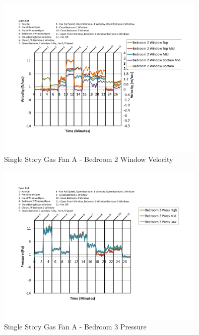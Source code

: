 \documentclass{article}
\begin{document}
\begin{appendices}
	\clearpage

	\begin{figure}[H]
		\centering
		\includegraphics[height=3.05in,trim=0.67in 1.1in 0.67in 0.8in,clip=true]{0_Images/Results_Charts/ColdFlow/Single_Story/Gas/A/Bedroom_2_Window_Velocity.pdf}
		\caption{Single Story Gas Fan A - Bedroom 2 Window Velocity}
	\end{figure}
 

	\begin{figure}[H]
		\centering
		\includegraphics[height=3.05in,trim=0.67in 1.1in 0.67in 0.8in,clip=true]{0_Images/Results_Charts/ColdFlow/Single_Story/Gas/A/Bedroom_3_Pressure.pdf}
		\caption{Single Story Gas Fan A - Bedroom 3 Pressure}
	\end{figure}
 
	\clearpage


\end{appendices}
\end{document}
